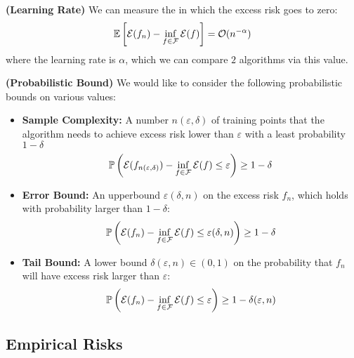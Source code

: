 \begin{definition}{\textbf{(Learning Rate)}}
    We can measure the  in which the excess risk goes to zero:
    \begin{equation*}
        \mathbb{E}\left[ \mathcal{E}(f_n) - \inf_{f\in\mathcal{F}}\mathcal{E}(f)  \right] = \mathcal{O}(n^{-\alpha})
    \end{equation*}
    where the learning rate is $\alpha$, which we can compare $2$ algorithms via this value.
\end{definition}

\begin{definition}{\textbf{(Probabilistic Bound)}}
    We would like to consider the following probabilistic bounds on various values:
    \begin{itemize}
        \item \textbf{Sample Complexity: } A number $n(\varepsilon,\delta)$ of training points that the algorithm needs to achieve excess risk lower than $\varepsilon$ with a least probability $1-\delta$
        \begin{equation*}
            \mathbb{P}\left( \mathcal{E}(f_{n(\varepsilon, \delta)}) - \inf_{f\in\mathcal{F}}\mathcal{E}(f)\le\varepsilon  \right) \ge 1-\delta
        \end{equation*}
        \item \textbf{Error Bound: } An upperbound $\varepsilon(\delta, n)$ on the excess risk $f_n$, which holds with probability larger than $1-\delta$:
        \begin{equation*}
            \mathbb{P}\left( \mathcal{E}(f_{n}) - \inf_{f\in\mathcal{F}}\mathcal{E}(f)\le\varepsilon(\delta, n)  \right) \ge 1-\delta 
        \end{equation*}
        \item \textbf{Tail Bound: } A lower bound $\delta(\varepsilon, n)\in(0, 1)$ on the probability that $f_n$ will have excess risk larger than $\varepsilon$:
        \begin{equation*}
            \mathbb{P}\left( \mathcal{E}(f_{n}) - \inf_{f\in\mathcal{F}}\mathcal{E}(f)\le\varepsilon  \right) \ge 1-\delta(\varepsilon, n)  
        \end{equation*}
    \end{itemize}
\end{definition}

\subsection{Empirical Risks}

